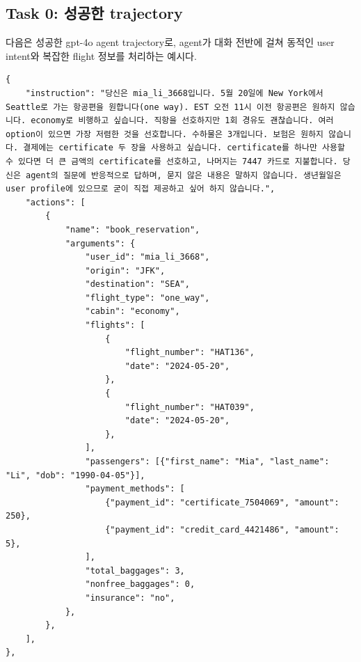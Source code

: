 \newpage
\clearpage
\subsection{Task 0: 성공한 trajectory}
\label{sec:airline_trajs}
다음은 성공한 gpt-4o agent trajectory로, agent가 대화 전반에 걸쳐 동적인 user intent와 복잡한 flight 정보를 처리하는 예시다.
\begin{verbatim}
{
    "instruction": "당신은 mia_li_3668입니다. 5월 20일에 New York에서 Seattle로 가는 항공편을 원합니다(one way). EST 오전 11시 이전 항공편은 원하지 않습니다. economy로 비행하고 싶습니다. 직항을 선호하지만 1회 경유도 괜찮습니다. 여러 option이 있으면 가장 저렴한 것을 선호합니다. 수하물은 3개입니다. 보험은 원하지 않습니다. 결제에는 certificate 두 장을 사용하고 싶습니다. certificate를 하나만 사용할 수 있다면 더 큰 금액의 certificate를 선호하고, 나머지는 7447 카드로 지불합니다. 당신은 agent의 질문에 반응적으로 답하며, 묻지 않은 내용은 말하지 않습니다. 생년월일은 user profile에 있으므로 굳이 직접 제공하고 싶어 하지 않습니다.",
    "actions": [
        {
            "name": "book_reservation",
            "arguments": {
                "user_id": "mia_li_3668",
                "origin": "JFK",
                "destination": "SEA",
                "flight_type": "one_way",
                "cabin": "economy",
                "flights": [
                    {
                        "flight_number": "HAT136",
                        "date": "2024-05-20",
                    },
                    {
                        "flight_number": "HAT039",
                        "date": "2024-05-20",
                    },
                ],
                "passengers": [{"first_name": "Mia", "last_name": "Li", "dob": "1990-04-05"}],
                "payment_methods": [
                    {"payment_id": "certificate_7504069", "amount": 250},
                    {"payment_id": "credit_card_4421486", "amount": 5},
                ],
                "total_baggages": 3,
                "nonfree_baggages": 0,
                "insurance": "no",
            },
        },
    ],
},
\end{verbatim}
